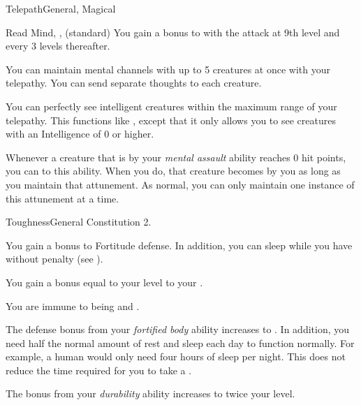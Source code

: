 \begin{feat}{Telepath}{General, Magical}
\begin{sustainability}{Read Mind}{, ,  (standard)}
            \rankline
            You gain a  bonus to  with the attack at 9th level and every 3 levels thereafter.
        \end{sustainability}

         You can maintain mental channels with up to 5 creatures at once with your telepathy.
        You can send separate thoughts to each creature.

         You can perfectly see intelligent creatures within the maximum range of your telepathy.
        This functions like , except that it only allows you to see creatures with an Intelligence of 0 or higher.

         Whenever a creature that is \stunned by your \textit{mental assault} ability reaches 0 hit points, you can  to this ability.
        When you do, that creature becomes \dominated by you as long as you maintain that attunement.
        As normal, you can only maintain one instance of this attunement at a time.
    \end{feat}

    \begin{feat}{Toughness}{General}
        \featpre Constitution 2.

         You gain a  bonus to Fortitude defense.
        In addition, you can sleep while you have  without penalty (see ).

         You gain a bonus equal to your level to your .

         You are immune to being \dazed and \stunned.

         The defense bonus from your \textit{fortified body} ability increases to .
        In addition, you need half the normal amount of rest and sleep each day to function normally.
        For example, a human would only need four hours of sleep per night.
        This does not reduce the time required for you to take a .

         The bonus from your \textit{durability} ability increases to twice your level.
    \end{feat}

